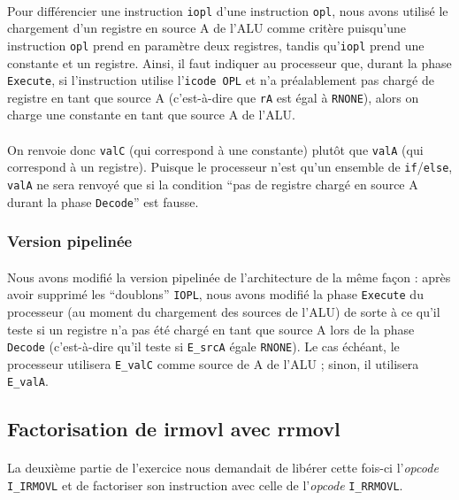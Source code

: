 \documentclass[12pt]{article}
\begin{document}
\paragraph{}Pour différencier une instruction \verb+iopl+ d'une instruction \verb+opl+, nous avons utilisé le chargement d'un registre en source A de l'ALU comme critère puisqu'une instruction \verb+opl+ prend en paramètre deux registres, tandis qu'\verb+iopl+ prend une constante et un registre. Ainsi, il faut indiquer au processeur que, durant la phase \verb+Execute+, si l'instruction utilise l'\verb+icode OPL+ et n'a préalablement pas chargé de registre en tant que source A (c'est-à-dire que \verb+rA+ est égal à \verb+RNONE+), alors on charge une constante en tant que source A de l'ALU.

\paragraph{}On renvoie donc \verb+valC+ (qui correspond à une constante) plutôt que \verb+valA+ (qui correspond à un registre). Puisque le processeur n'est qu'un ensemble de \verb+if+/\verb+else+, \verb+valA+ ne sera renvoyé que si la condition ``pas de registre chargé en source A durant la phase \verb+Decode+'' est fausse.

\subsubsection{Version pipelinée}
\paragraph{}Nous avons modifié la version pipelinée de l'architecture de la même façon : après avoir supprimé les ``doublons'' \verb+IOPL+, nous avons modifié la phase \verb+Execute+ du processeur (au moment du chargement des sources de l'ALU) de sorte à ce qu'il teste si un registre n'a pas été chargé en tant que source A lors de la phase \verb+Decode+ (c'est-à-dire qu'il teste si \verb+E_srcA+ égale \verb+RNONE+). Le cas échéant, le processeur utilisera \verb+E_valC+ comme source de A de l'ALU ; sinon, il utilisera \verb+E_valA+.



\subsection{Factorisation de irmovl avec rrmovl}
\paragraph{}La deuxième partie de l'exercice nous demandait de libérer cette fois-ci l'{\itshape opcode} \verb+I_IRMOVL+ et de factoriser son instruction avec celle de l'{\itshape opcode} \verb+I_RRMOVL+.
\end{document}
